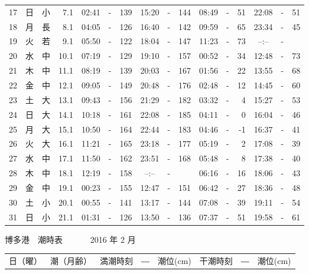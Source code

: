 \documentclass[12pt.a4j]{jsarticle}
\begin{document}
\begin{center}
\begin{table}[ht]
\begin{tabular}{|rc|cr|ccrccr|ccrccr|}
17 & 日 & 小 &  7.1 &  02:41 &-& 139  &  15:20 &-& 144  &   08:49 &-&  51  &   22:08 &-&  51  \\
18 & 月 & 長 &  8.1 &  04:05 &-& 126  &  16:40 &-& 142  &   09:59 &-&  65  &   23:34 &-&  45  \\
19 & 火 & 若 &  9.1 &  05:50 &-& 122  &  18:04 &-& 147  &   11:23 &-&  73  &   --:-- &-&     \\
20 & 水 & 中 & 10.1 &  07:19 &-& 129  &  19:10 &-& 157  &   00:52 &-&  34  &   12:48 &-&  73  \\
21 & 木 & 中 & 11.1 &  08:19 &-& 139  &  20:03 &-& 167  &   01:56 &-&  22  &   13:55 &-&  68  \\
22 & 金 & 中 & 12.1 &  09:05 &-& 149  &  20:48 &-& 176  &   02:48 &-&  12  &   14:45 &-&  60  \\
23 & 土 & 大 & 13.1 &  09:43 &-& 156  &  21:29 &-& 182  &   03:32 &-&   4  &   15:27 &-&  53  \\
24 & 日 & 大 & 14.1 &  10:18 &-& 161  &  22:08 &-& 185  &   04:11 &-&   0  &   16:04 &-&  46  \\
25 & 月 & 大 & 15.1 &  10:50 &-& 164  &  22:44 &-& 183  &   04:46 &-&  -1  &   16:37 &-&  41  \\
26 & 火 & 大 & 16.1 &  11:21 &-& 165  &  23:18 &-& 177  &   05:19 &-&   2  &   17:08 &-&  39  \\
27 & 水 & 中 & 17.1 &  11:50 &-& 162  &  23:51 &-& 168  &   05:48 &-&   8  &   17:38 &-&  40  \\
28 & 木 & 中 & 18.1 &  12:19 &-& 158  &  --:-- &-&     &   06:16 &-&  16  &   18:06 &-&  43  \\
29 & 金 & 中 & 19.1 &  00:23 &-& 155  &  12:47 &-& 151  &   06:42 &-&  27  &   18:36 &-&  48  \\
30 & 土 & 小 & 20.1 &  00:55 &-& 141  &  13:17 &-& 144  &   07:08 &-&  39  &   19:11 &-&  54  \\
31 & 日 & 小 & 21.1 &  01:31 &-& 126  &  13:50 &-& 136  &   07:37 &-&  51  &   19:58 &-&  61  \\
   \hline
   \end{tabular}
\end{table}
\newpage
 {\LARGE 博多港　潮時表　　　}
 {\large 2016 年  2 月}\\
 \begin{table}[ht]
    \begin{tabular}{|rc|cr|ccrccr|ccrccr|}
    \hline
    \multicolumn{2}{|c|}{日（曜）} & \multicolumn{2}{c|}{潮（月齢）} & \multicolumn{6}{c|}{満潮時刻　―　潮位(cm)} & \multicolumn{6}{c|}{干潮時刻　―　潮位(cm)} \\

\end{tabular}
\end{table}
\end{center}
\end{document}
